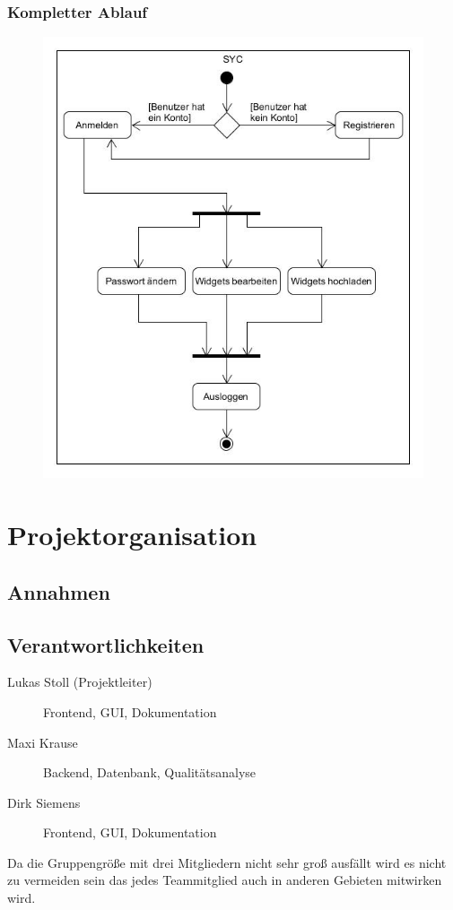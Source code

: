 		\subsubsection{Kompletter Ablauf}
		
			\begin{figure}[H]
				\includegraphics[scale=0.6]{images/ActivityComplete}
			\end{figure}
	

\section{Projektorganisation}

	\subsection{Annahmen}
	
	\subsection{Verantwortlichkeiten}
		\begin{description}
			\item[Lukas Stoll (Projektleiter)] Frontend, GUI, Dokumentation
			\item[Maxi Krause] Backend, Datenbank, Qualitätsanalyse
			\item[Dirk Siemens] Frontend, GUI, Dokumentation
		\end{description}
		Da die Gruppengröße mit drei Mitgliedern nicht sehr groß ausfällt wird es nicht zu vermeiden sein das jedes Teammitglied auch in anderen Gebieten mitwirken wird. 
	
